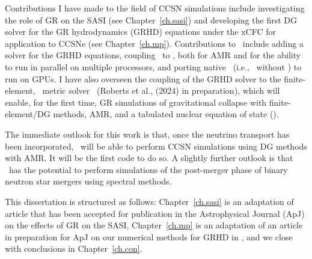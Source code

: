 Contributions I have made to the field of CCSN simulations
include investigating the role of GR
on the SASI (see Chapter~\ref{ch.sasi}) and developing the first DG solver
for the GR hydrodynamics (GRHD) equations under the xCFC
for application to CCSNe (see Chapter~\ref{ch.mp}).
Contributions to \thornado\ include adding a solver for the GRHD equations,
coupling \thornado\ to \amrex, both for AMR and for the ability to run
in parallel on multiple processors,
and porting native \thornado\ (i.e., \thornado\ without \amrex)
to run on GPUs.
I have also overseen the coupling of the GRHD solver
to the finite-element, \xcfc\ metric solver \poseidon\ (Roberts et al.,
(2024) in preparation),
which will enable, for the first time,
GR simulations of gravitational collapse with finite-element/DG methods, AMR,
and a tabulated nuclear equation of state (\eos).

The immediate outlook for this work is that, once the neutrino transport
has been incorporated, \thornado\ will be able to perform CCSN simulations
using DG methods with AMR.
It will be the first code to do so.
A slightly further outlook is that \thornado\ has the potential to perform
simulations of the post-merger phase of binary neutron star mergers
using spectral methods.

This dissertation is structured as follows: Chapter~\ref{ch.sasi} is an adaptation
of article that has been accepted for publication in the Astrophysical Journal (ApJ)
on the effects of GR on the SASI,
Chapter~\ref{ch.mp} is an adaptation of an article in preparation for ApJ on our
numerical methods for GRHD in \thornado,
and we close with conclusions in Chapter~\ref{ch.con}.

